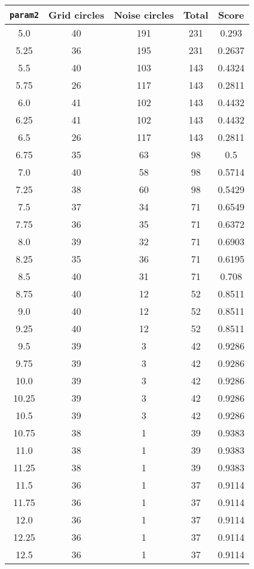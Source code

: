 \documentclass[letterpaper, 12pt]{article}
\begin{document}
\begin{longtable}{|c|c|c|c|c|}
\hline
\textbf{\texttt{param2}} & \textbf{Grid circles} & \textbf{Noise circles} & \textbf{Total} & \textbf{Score} \\
\hline
5.0 & 40 & 191 & 231 & 0.293 \\
\hline
5.25 & 36 & 195 & 231 & 0.2637 \\
\hline
5.5 & 40 & 103 & 143 & 0.4324 \\
\hline
5.75 & 26 & 117 & 143 & 0.2811 \\
\hline
6.0 & 41 & 102 & 143 & 0.4432 \\
\hline
6.25 & 41 & 102 & 143 & 0.4432 \\
\hline
6.5 & 26 & 117 & 143 & 0.2811 \\
\hline
6.75 & 35 & 63 & 98 & 0.5 \\
\hline
7.0 & 40 & 58 & 98 & 0.5714 \\
\hline
7.25 & 38 & 60 & 98 & 0.5429 \\
\hline
7.5 & 37 & 34 & 71 & 0.6549 \\
\hline
7.75 & 36 & 35 & 71 & 0.6372 \\
\hline
8.0 & 39 & 32 & 71 & 0.6903 \\
\hline
8.25 & 35 & 36 & 71 & 0.6195 \\
\hline
8.5 & 40 & 31 & 71 & 0.708 \\
\hline
8.75 & 40 & 12 & 52 & 0.8511 \\
\hline
9.0 & 40 & 12 & 52 & 0.8511 \\
\hline
9.25 & 40 & 12 & 52 & 0.8511 \\
\hline
9.5 & 39 & 3 & 42 & 0.9286 \\
\hline
9.75 & 39 & 3 & 42 & 0.9286 \\
\hline
10.0 & 39 & 3 & 42 & 0.9286 \\
\hline
10.25 & 39 & 3 & 42 & 0.9286 \\
\hline
10.5 & 39 & 3 & 42 & 0.9286 \\
\hline
10.75 & 38 & 1 & 39 & 0.9383 \\
\hline
11.0 & 38 & 1 & 39 & 0.9383 \\
\hline
11.25 & 38 & 1 & 39 & 0.9383 \\
\hline
11.5 & 36 & 1 & 37 & 0.9114 \\
\hline
11.75 & 36 & 1 & 37 & 0.9114 \\
\hline
12.0 & 36 & 1 & 37 & 0.9114 \\
\hline
12.25 & 36 & 1 & 37 & 0.9114 \\
\hline
12.5 & 36 & 1 & 37 & 0.9114 \\

\end{longtable}
\end{document}
